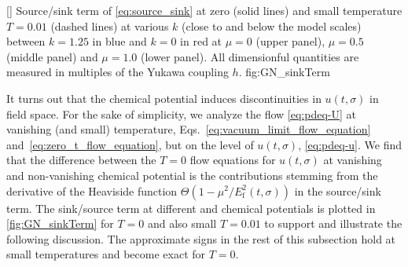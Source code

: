 	[]%
	{%
		Source/sink term of \cref{eq:source_sink} at zero (solid lines) and small temperature $T=0.01$ (dashed lines) at various \rgscales{} $k$ (close to and below the model scales) between $k = 1.25$ in {blue} and $k = 0$ in {red} at $\mu = 0$ (upper panel), $\mu = 0.5$ (middle panel) and $\mu = 1.0$ (lower panel). All dimensionful quantities are measured in multiples of the Yukawa coupling $h$.
	}%
	{fig:GN_sinkTerm}%

It turns out that the chemical potential induces discontinuities in $u ( t, \sigma )$ in field space.
For the sake of simplicity, we analyze the \frg{} flow \cref{eq:pdeq-U} at vanishing (and small) temperature, \viz{} Eqs.~\eqref{eq:vacuum_limit_flow_equation} and~\eqref{eq:zero_t_flow_equation}, but on the level of $u ( t, \sigma )$, \cf{} \cref{eq:pdeq-u}.
We find that the difference between the $T = 0$ flow equations for $u ( t, \sigma )$ at vanishing and non-vanishing chemical potential is the contributions stemming from the derivative of the Heaviside function $\Theta ( 1 - \mu^2/E_\mathrm{f}^2 ( t, \sigma ) )$ in the source/sink term.
The sink/source term at different \rgscales{} and chemical potentials is plotted in \cref{fig:GN_sinkTerm} for $T=0$ and also small $T=0.01$ to support and illustrate the following discussion.
The approximate signs in the rest of this subsection hold at small temperatures and become exact for $T=0$.
	
